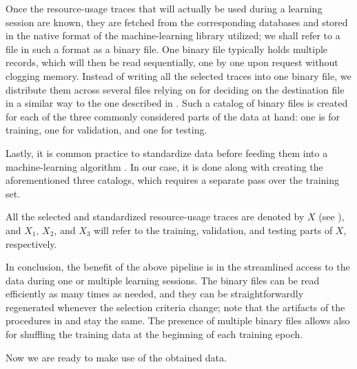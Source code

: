 Once the resource-usage traces that will actually be used during a learning
session are known, they are fetched from the corresponding databases and stored
in the native format of the machine-learning library utilized; we shall refer to
a file in such a format as a binary file. One binary file typically holds
multiple records, which will then be read sequentially, one by one upon request
without clogging memory. Instead of writing all the selected traces into one
binary file, we distribute them across several files relying on  for
deciding on the destination file in a similar way to the one described in
. Such a catalog of binary files is created for each of the three
commonly considered parts \cite{hastie2009} of the data at hand: one is for
training, one for validation, and one for testing.

Lastly, it is common practice to standardize data before feeding them into a
machine-learning algorithm \cite{hastie2009}. In our case, it is done along with
creating the aforementioned three catalogs, which requires a separate pass over
the training set.

All the selected and standardized resource-usage traces are denoted by $X$ (see
), and $X_1$, $X_2$, and $X_3$ will refer to the training,
validation, and testing parts of $X$, respectively.

In conclusion, the benefit of the above pipeline is in the streamlined access to
the data during one or multiple learning sessions. The binary files can be read
efficiently as many times as needed, and they can be straightforwardly
regenerated whenever the selection criteria change; note that the artifacts of
the procedures in  and  stay the same. The
presence of multiple binary files allows also for shuffling the training data at
the beginning of each training epoch.

Now we are ready to make use of the obtained data.

